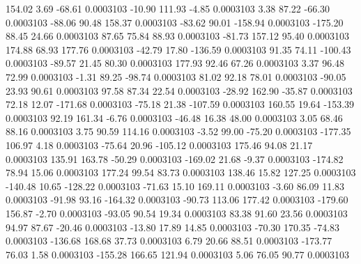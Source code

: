       154.02        3.69      -68.61     0.0003103
      -10.90      111.93       -4.85     0.0003103
        3.38       87.22      -66.30     0.0003103
      -88.06       90.48      158.37     0.0003103
      -83.62       90.01     -158.94     0.0003103
     -175.20       88.45       24.66     0.0003103
       87.65       75.84       88.93     0.0003103
      -81.73      157.12       95.40     0.0003103
      174.88       68.93      177.76     0.0003103
      -42.79       17.80     -136.59     0.0003103
       91.35       74.11     -100.43     0.0003103
      -89.57       21.45       80.30     0.0003103
      177.93       92.46       67.26     0.0003103
        3.37       96.48       72.99     0.0003103
       -1.31       89.25      -98.74     0.0003103
       81.02       92.18       78.01     0.0003103
      -90.05       23.93       90.61     0.0003103
       97.58       87.34       22.54     0.0003103
      -28.92      162.90      -35.87     0.0003103
       72.18       12.07     -171.68     0.0003103
      -75.18       21.38     -107.59     0.0003103
      160.55       19.64     -153.39     0.0003103
       92.19      161.34       -6.76     0.0003103
      -46.48       16.38       48.00     0.0003103
        3.05       68.46       88.16     0.0003103
        3.75       90.59      114.16     0.0003103
       -3.52       99.00      -75.20     0.0003103
     -177.35      106.97        4.18     0.0003103
      -75.64       20.96     -105.12     0.0003103
      175.46       94.08       21.17     0.0003103
      135.91      163.78      -50.29     0.0003103
     -169.02       21.68       -9.37     0.0003103
     -174.82       78.94       15.06     0.0003103
      177.24       99.54       83.73     0.0003103
      138.46       15.82      127.25     0.0003103
     -140.48       10.65     -128.22     0.0003103
      -71.63       15.10      169.11     0.0003103
       -3.60       86.09       11.83     0.0003103
      -91.98       93.16     -164.32     0.0003103
      -90.73      113.06      177.42     0.0003103
     -179.60      156.87       -2.70     0.0003103
      -93.05       90.54       19.34     0.0003103
       83.38       91.60       23.56     0.0003103
       94.97       87.67      -20.46     0.0003103
      -13.80       17.89       14.85     0.0003103
      -70.30      170.35      -74.83     0.0003103
     -136.68      168.68       37.73     0.0003103
        6.79       20.66       88.51     0.0003103
     -173.77       76.03        1.58     0.0003103
     -155.28      166.65      121.94     0.0003103
        5.06       76.05       90.77     0.0003103
